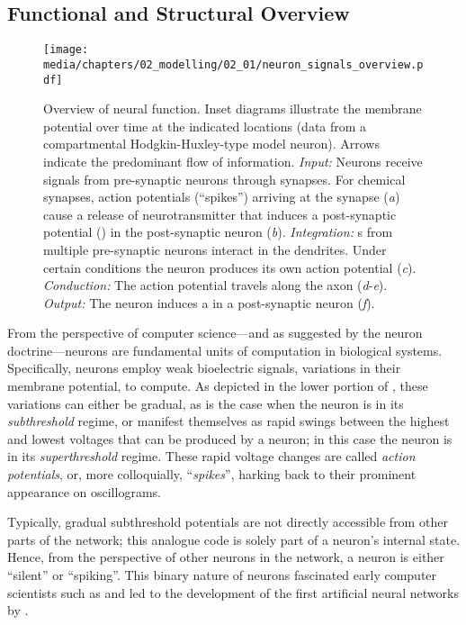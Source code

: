\subsection{Functional and Structural Overview}
\label{sec:neurons_overview}

\begin{figure}
	\centering
	\texttt{[image: media/chapters/02\_modelling/02\_01/neuron\_signals\_overview.pdf]}
	\caption[Overview of neural function]{Overview of neural function. Inset diagrams illustrate the membrane potential over time at the indicated locations (data from a compartmental Hodgkin-Huxley-type model neuron). Arrows indicate the predominant flow of information. \emph{Input:} Neurons receive signals from pre-synaptic neurons through synapses. For chemical synapses, action potentials (\enquote{spikes}) arriving at the synapse (\emph{a}) cause a release of neurotransmitter that induces a post-synaptic potential (\PSP) in the post-synaptic neuron (\emph{b}). \emph{Integration:} {\PSP}s from multiple pre-synaptic neurons interact in the dendrites. Under certain conditions the neuron produces its own action potential (\emph{c}). \emph{Conduction:} The action potential travels along the axon (\emph{d}-\emph{e}). \emph{Output:} The neuron induces a \PSP in a post-synaptic neuron (\emph{f}).
	}
	\label{fig:neuron_signal_overview}
\end{figure}

From the perspective of computer science---and as suggested by the neuron doctrine---neurons are fundamental units of computation in biological systems.
Specifically, neurons employ weak bioelectric signals, variations in their membrane potential, to compute.
As depicted in the lower portion of , these variations can either be gradual, as is the case when the neuron is in its \emph{subthreshold} regime, or manifest themselves as rapid swings between the highest and lowest voltages that can be produced by a neuron; in this case the neuron is in its \emph{superthreshold} regime.
These rapid voltage changes are called \emph{action potentials}, or, more colloquially, \enquote{\emph{spikes}}, harking back to their prominent appearance on oscillograms.

Typically, gradual subthreshold potentials are not directly accessible from other parts of the network;
this analogue code is solely part of a neuron's internal state.
Hence, from the perspective of other neurons in the network, a neuron is either \enquote{silent} or \enquote{spiking}.
This binary nature of neurons fascinated early computer scientists such as \citet{vonneumann1958computer} and led to the development of the first artificial neural networks by \citet{mcculloch1943logical}.

